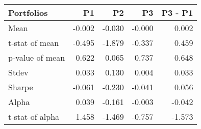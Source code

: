 \begin{tabular}{lrrrr}
\toprule
Portfolios & P1 & P2 & P3 & P3 - P1 \\
\midrule
Mean & -0.002 & -0.030 & -0.000 & 0.002 \\
t-stat of mean & -0.495 & -1.879 & -0.337 & 0.459 \\
p-value of mean & 0.622 & 0.065 & 0.737 & 0.648 \\
Stdev & 0.033 & 0.130 & 0.004 & 0.033 \\
Sharpe & -0.061 & -0.230 & -0.041 & 0.056 \\
Alpha & 0.039 & -0.161 & -0.003 & -0.042 \\
t-stat of alpha & 1.458 & -1.469 & -0.757 & -1.573 \\
\bottomrule
\end{tabular}
